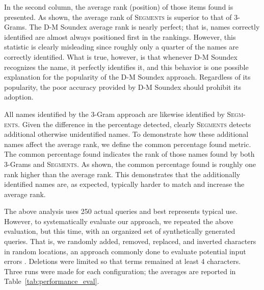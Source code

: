 \documentclass{endm}
\begin{document}
\begin{CJK}{UTF8}{song}
In the second column, the average rank (position) of those items found is presented.  As shown, the average rank of S\textsc{egments} is superior to that of 3-Grams.  The D-M Soundex average rank is nearly perfect; that is, names correctly identified are almost always positioned first in the rankings.  However, this statistic is clearly misleading since roughly only a quarter of the names are correctly identified.  What is true, however, is that whenever D-M Soundex recognizes the name, it perfectly identifies it, and this behavior is one possible explanation for the popularity of the D-M Soundex approach.  Regardless of its popularity, the poor accuracy provided by D-M Soundex should prohibit its adoption.

All names identified by the 3-Gram approach are likewise identified by S\textsc{egm-ents}.  Given the difference in the percentage detected, clearly S\textsc{egments} detects additional otherwise unidentified names. To demonstrate how these additional names affect the average rank, we define the common percentage found metric.  The common percentage found indicates the rank of those names found by both 3-Grams and S\textsc{egments}. As shown, the common percentage found is roughly one rank higher than the average rank.  This demonstrates that the additionally identified names are, as expected, typically harder to match and increase the average rank.

The above analysis uses 250 actual queries and best represents typical use.  However, to systematically evaluate our approach, we repeated the above evaluation, but this time, with an organized set of synthetically generated queries.  That is, we randomly added, removed, replaced, and inverted characters in random locations, an approach commonly done to evaluate potential input errors \cite{mitton:spellchecking}.  Deletions were limited so that terms remained at least 4 characters.  Three runs were made for each configuration; the averages are reported in Table~\ref{tab:performance_eval}.  


\end{CJK}
\end{document}
